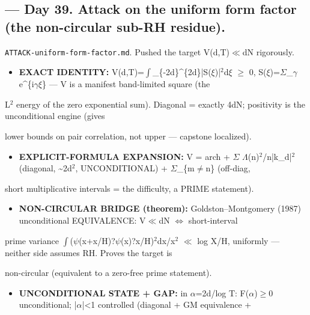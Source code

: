 \documentclass[10pt]{article}
\begin{document}
\subsection*{ --- Day 39. Attack on the uniform form factor (the non-circular sub-RH residue).}
\texttt{ATTACK-uniform-form-factor.md}. Pushed the target V(d,T)\ensuremath{\ll}dN rigorously.\par
\begin{itemize}
\item \textbf{EXACT IDENTITY:} V(d,T)=\ensuremath{\int}\_\{-2d\}\textasciicircum{}\{2d\}|S(\ensuremath{\xi})|\ensuremath{^2}d\ensuremath{\xi} \ensuremath{\ge} 0, S(\ensuremath{\xi})=\ensuremath{\Sigma}\_\ensuremath{\gamma} e\textasciicircum{}\{i\ensuremath{\gamma}\ensuremath{\xi}\} --- V is a manifest band-limited square (the
\end{itemize}
  L\ensuremath{^2} energy of the zero exponential sum). Diagonal = exactly 4dN; positivity is the unconditional engine (gives\par
  lower bounds on pair correlation, not upper --- capstone localized).\par
\begin{itemize}
\item \textbf{EXPLICIT-FORMULA EXPANSION:} V = arch + \ensuremath{\Sigma} \ensuremath{\Lambda}(n)\ensuremath{^2}/n|k\_d|\ensuremath{^2} (diagonal, \textasciitilde{}2d\ensuremath{^2}, UNCONDITIONAL) + \ensuremath{\Sigma}\_\{m\ensuremath{\ne}n\} (off-diag,
\end{itemize}
  short multiplicative intervals = the difficulty, a PRIME statement).\par
\begin{itemize}
\item \textbf{NON-CIRCULAR BRIDGE (theorem):} Goldston--Montgomery (1987) unconditional EQUIVALENCE: V\ensuremath{\ll}dN \ensuremath{\iff} short-interval
\end{itemize}
  prime variance \ensuremath{\int}(\ensuremath{\psi}(x+x/H)?\ensuremath{\psi}(x)?x/H)\ensuremath{^2}dx/x\ensuremath{^2} \ensuremath{\ll} log X/H, uniformly --- neither side assumes RH. Proves the target is\par
  non-circular (equivalent to a zero-free prime statement).\par
\begin{itemize}
\item \textbf{UNCONDITIONAL STATE + GAP:} in \ensuremath{\alpha}=2d/log T: F(\ensuremath{\alpha})\ensuremath{\ge}0 unconditional; |\ensuremath{\alpha}|<1 controlled (diagonal + GM equivalence +
\end{itemize}
\end{document}
